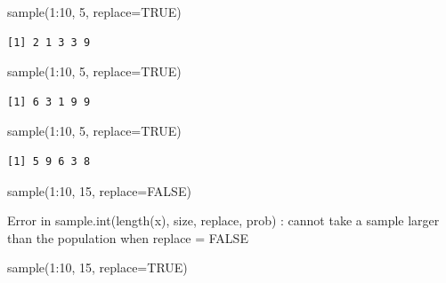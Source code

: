 \documentclass[
  letterpaper,
  DIV=11,
  numbers=noendperiod]{scrreprt}
\newenvironment{Shaded}{\begin{snugshade}}{\end{snugshade}}
\newcommand{\AttributeTok}[1]{\textcolor[rgb]{0.40,0.45,0.13}{#1}}
\newcommand{\ConstantTok}[1]{\textcolor[rgb]{0.56,0.35,0.01}{#1}}
\newcommand{\DecValTok}[1]{\textcolor[rgb]{0.68,0.00,0.00}{#1}}
\newcommand{\FunctionTok}[1]{\textcolor[rgb]{0.28,0.35,0.67}{#1}}
\newcommand{\NormalTok}[1]{\textcolor[rgb]{0.00,0.23,0.31}{#1}}
\newcommand{\SpecialCharTok}[1]{\textcolor[rgb]{0.37,0.37,0.37}{#1}}
\begin{document}
\begin{Shaded}
\begin{Highlighting}[]
\FunctionTok{sample}\NormalTok{(}\DecValTok{1}\SpecialCharTok{:}\DecValTok{10}\NormalTok{, }\DecValTok{5}\NormalTok{, }\AttributeTok{replace=}\ConstantTok{TRUE}\NormalTok{)}
\end{Highlighting}
\end{Shaded}

\begin{verbatim}
[1] 2 1 3 3 9
\end{verbatim}

\begin{Shaded}
\begin{Highlighting}[]
\FunctionTok{sample}\NormalTok{(}\DecValTok{1}\SpecialCharTok{:}\DecValTok{10}\NormalTok{, }\DecValTok{5}\NormalTok{, }\AttributeTok{replace=}\ConstantTok{TRUE}\NormalTok{)}
\end{Highlighting}
\end{Shaded}

\begin{verbatim}
[1] 6 3 1 9 9
\end{verbatim}

\begin{Shaded}
\begin{Highlighting}[]
\FunctionTok{sample}\NormalTok{(}\DecValTok{1}\SpecialCharTok{:}\DecValTok{10}\NormalTok{, }\DecValTok{5}\NormalTok{, }\AttributeTok{replace=}\ConstantTok{TRUE}\NormalTok{)}
\end{Highlighting}
\end{Shaded}

\begin{verbatim}
[1] 5 9 6 3 8
\end{verbatim}

\begin{Shaded}
\begin{Highlighting}[]
\FunctionTok{sample}\NormalTok{(}\DecValTok{1}\SpecialCharTok{:}\DecValTok{10}\NormalTok{, }\DecValTok{15}\NormalTok{, }\AttributeTok{replace=}\ConstantTok{FALSE}\NormalTok{)}
\end{Highlighting}
\end{Shaded}

{Error in sample.int(length(x), size, replace, prob) : cannot take a
sample larger than the population when \textquotesingle replace =
FALSE\textquotesingle{}}

\begin{Shaded}
\begin{Highlighting}[]
\FunctionTok{sample}\NormalTok{(}\DecValTok{1}\SpecialCharTok{:}\DecValTok{10}\NormalTok{, }\DecValTok{15}\NormalTok{, }\AttributeTok{replace=}\ConstantTok{TRUE}\NormalTok{)}
\end{Highlighting}
\end{Shaded}
\end{document}
